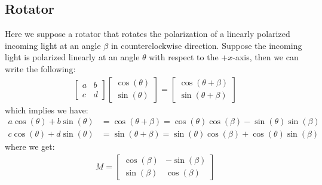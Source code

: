 \documentclass[11pt]{book}
\theoremstyle{break}
\theoremstyle{break}
\newcommand{\bmat}[1]{\begin{bmatrix} #1 \end{bmatrix}}
\begin{document}
\subsection{Rotator}
Here we suppose a rotator that rotates the polarization of a linearly polarized incoming light at an angle $\beta$ in counterclockwise direction. Suppose the incoming light is polarized linearly at an angle $\theta$ with respect to the +$x$-axis, then we can write the following:
\begin{align*}
\bmat{a & b \\c &d }\bmat{\cos(\theta) \\ \sin(\theta)} = \bmat{\cos(\theta+ \beta) \\ \sin(\theta + \beta)}
\end{align*}
which implies we have:
\begin{align*}
a\cos(\theta) + b \sin(\theta) &= \cos(\theta+ \beta) = \cos(\theta) \cos(\beta) - \sin(\theta) \sin(\beta)\\
c\cos(\theta) + d \sin(\theta) &= \sin(\theta+\beta) = \sin(\theta) \cos(\beta) + \cos(\theta) \sin(\beta)
\end{align*}
where we get:
\begin{align*}
M = \bmat{\cos(\beta) & -\sin(\beta) \\ \sin(\beta) & \cos(\beta)}
\end{align*}
\end{document}
